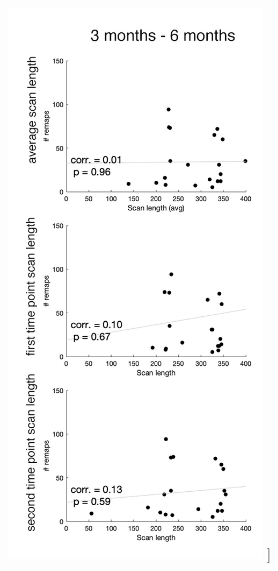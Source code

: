\documentclass[phd,tocprelim]{cornell}
\renewcommand{\caption}[1]{\singlespacing\hangcaption{#1}\normalspacing}
\begin{document}
\begin{figure}[h!]
		\ContinuedFloat
		\captionsetup{labelformat=adja-page}
    \centering
    \includegraphics[width=0.6\textwidth]{chapter1/SupplementaryFigure4D.png}
    \caption[]{}
\end{figure}
\null
\vfill
\clearpage
\end{document}
